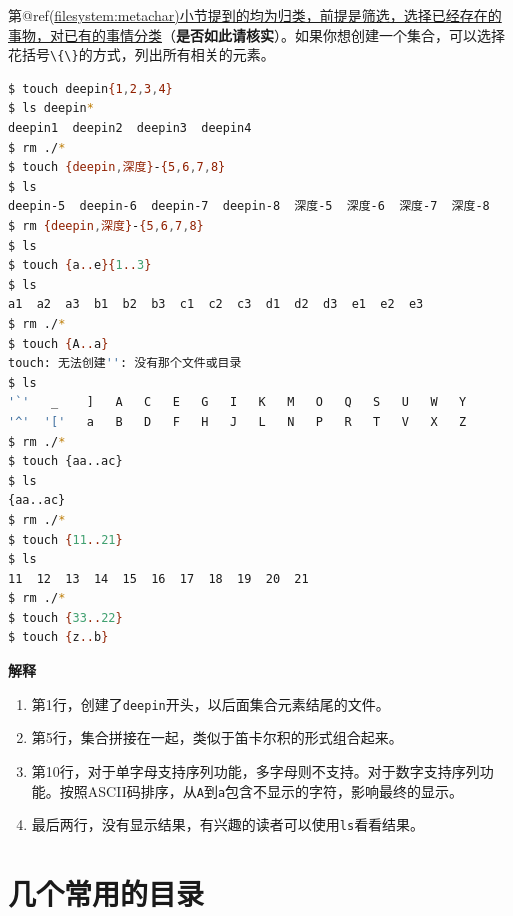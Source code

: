 \documentclass[doctor,openright,twoside]{sjtuthesis}
\providecommand{\tightlist}{%
    \setlength{\itemsep}{0pt}\setlength{\parskip}{0pt}}
\newcommand{\passthrough}[1]{#1}
\theoremstyle{plain}
\theoremstyle{definition}
\theoremstyle{remark}
\theoremstyle{ocrenumbox}
\theoremstyle{plain}
\begin{document}
第@ref(\url{filesystem:metachar)小节提到的均为归类，前提是筛选，选择已经存在的事物，对已有的事情分类}（\textbf{是否如此请核实}）。如果你想创建一个集合，可以选择花括号\passthrough{\lstinline!\{\}!}的方式，列出所有相关的元素。

\begin{lstlisting}[language=bash]
$ touch deepin{1,2,3,4}
$ ls deepin*
deepin1  deepin2  deepin3  deepin4
$ rm ./*
$ touch {deepin,深度}-{5,6,7,8}
$ ls
deepin-5  deepin-6  deepin-7  deepin-8  深度-5  深度-6  深度-7  深度-8
$ rm {deepin,深度}-{5,6,7,8}
$ ls
$ touch {a..e}{1..3}
$ ls
a1  a2  a3  b1  b2  b3  c1  c2  c3  d1  d2  d3  e1  e2  e3
$ rm ./*
$ touch {A..a}
touch: 无法创建'': 没有那个文件或目录
$ ls
'`'   _    ]   A   C   E   G   I   K   M   O   Q   S   U   W   Y
'^'  '['   a   B   D   F   H   J   L   N   P   R   T   V   X   Z
$ rm ./*
$ touch {aa..ac}
$ ls
{aa..ac}
$ rm ./*
$ touch {11..21}
$ ls
11  12  13  14  15  16  17  18  19  20  21
$ rm ./*
$ touch {33..22}
$ touch {z..b}
\end{lstlisting}

\textbf{解释}

\begin{enumerate}
\def\labelenumi{\arabic{enumi}.}
\tightlist
\item
  第1行，创建了\passthrough{\lstinline!deepin!}开头，以后面集合元素结尾的文件。
\item
  第5行，集合拼接在一起，类似于笛卡尔积的形式组合起来。
\item
  第10行，对于单字母支持序列功能，多字母则不支持。对于数字支持序列功能。按照ASCII码排序，从\passthrough{\lstinline!A!}到\passthrough{\lstinline!a!}包含不显示的字符，影响最终的显示。
\item
  最后两行，没有显示结果，有兴趣的读者可以使用\passthrough{\lstinline!ls!}看看结果。
\end{enumerate}

\hypertarget{section-63}{%
\section{几个常用的目录}\label{section-63}}
\end{document}
